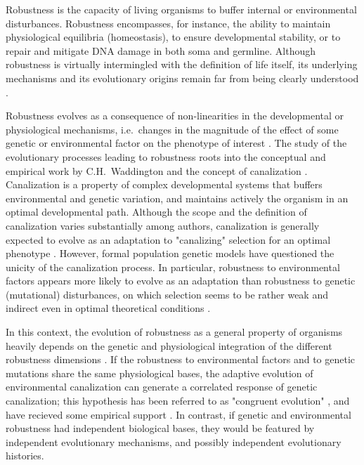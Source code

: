 \documentclass[10pt,a4paper]{article}
\begin{document}
Robustness is the capacity of living organisms to buffer internal or environmental disturbances. Robustness encompasses, for instance, the ability to maintain physiological equilibria (homeostasis), to ensure developmental stability, or to repair and mitigate DNA damage in both soma and germline. Although robustness is virtually intermingled with the definition of life itself, its underlying mechanisms and its evolutionary origins remain far from being clearly understood \citep{Ste02,MS09,Wag13,HGK+19}. 

Robustness evolves as a consequence of non-linearities in the developmental or physiological mechanisms, i.e.\ changes in the magnitude of the effect of some genetic or environmental factor on the phenotype of interest \citep{Nij02}. The study of the evolutionary processes leading to robustness roots into the conceptual and empirical work by C.H.\ Waddington and the concept of canalization \citep{Wad42,Sch49,Wad59,Loi19}. Canalization is a property of complex developmental systems that buffers environmental and genetic variation, and maintains actively the organism in an optimal developmental path. Although the scope and the definition of canalization varies substantially among authors, canalization is generally expected to evolve as an adaptation to "canalizing" selection for an optimal phenotype \citep{EM98,DD01,Fla05,Kli19}. However, formal population genetic models have questioned the unicity of the canalization process. In particular, robustness to environmental factors appears more likely to evolve as an adaptation than robustness to genetic (mutational) disturbances, on which selection seems to be rather weak and indirect even in optimal theoretical conditions \citep{WBB97, HHW03,LAH13}. 

In this context, the evolution of robustness as a general property of organisms heavily depends on the genetic and physiological integration of the different robustness dimensions \citep{Far15,FB15}. If the robustness to environmental factors and to genetic mutations share the same physiological bases, the adaptive evolution of environmental canalization can generate a correlated response of genetic canalization; this hypothesis has been referred to as "congruent evolution" \citep{dHW+03}, and have recieved some empirical support \citep{Leh10,TES13}. In contrast, if genetic and environmental robustness had independent biological bases, they would be featured by independent evolutionary mechanisms, and possibly independent evolutionary histories. 
\end{document}
